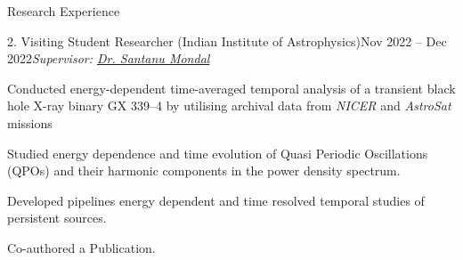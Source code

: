 \begin{rSection}{Research Experience}
\hspace{-1.2em}\begin{rSubsection}{2. Visiting Student Researcher (Indian Institute of Astrophysics)}{Nov 2022 -- Dec 2022}{\emph{Supervisor: \href{https://www.iiap.res.in/people/profile/academic/santanu-mondal/}{Dr. Santanu Mondal}}}{}
\item Conducted energy-dependent time-averaged temporal analysis of a transient black hole X-ray binary GX 339--4 by utilising archival data from \textit{NICER} and \textit{AstroSat} missions 
\item Studied energy dependence and time evolution of Quasi Periodic Oscillations (QPOs) and their harmonic
components in the power density spectrum.
\item Developed pipelines energy dependent and time resolved temporal studies of persistent sources. 
\item Co-authored a Publication.
\end{rSubsection}
\end{rSection}
